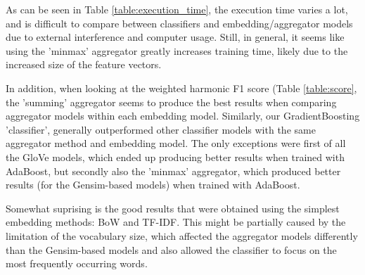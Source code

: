 As can be seen in Table \ref{table:execution_time}, the execution time varies a lot, and is difficult to compare between classifiers and embedding/aggregator models due to external interference and computer usage. Still, in general, it seems like using the 'minmax' aggregator greatly increases training time, likely due to the increased size of the feature vectors.

In addition, when looking at the weighted harmonic F1 score (Table \ref{table:score}, the 'summing' aggregator seems to produce the best results when comparing aggregator models within each embedding model. Similarly, our GradientBoosting 'classifier', generally outperformed other classifier models with the same aggregator method and embedding model. The only exceptions were first of all the GloVe models, which ended up producing better results when trained with AdaBoost, but secondly also the 'minmax' aggregator, which produced better results (for the Gensim-based models) when trained with AdaBoost.

Somewhat suprising is the good results that were obtained using the simplest embedding methods: BoW and TF-IDF. This might be partially caused by the limitation of the vocabulary size, which affected the aggregator models differently than the Gensim-based models and also allowed the classifier to focus on the most frequently occurring words.

